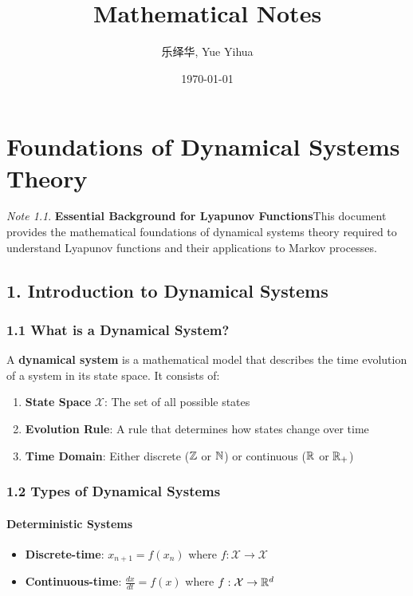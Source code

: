 \documentclass{amsart}
\author{乐绎华, Yue Yihua}
\date{\today}
\title{Mathematical Notes}
\let\originalmathbb\mathbb
\renewcommand{\mathbb}[1]{%
    \ifstrequal{#1}{1}{\mathbbm{#1}}{\originalmathbb{#1}}%
}
\theoremstyle{plain}
\theoremstyle{definition}
\theoremstyle{remark}
\newtheorem{note}[theorem]{Note}
\begin{document}
\maketitle
\tableofcontents

\chapter{Foundations of Dynamical Systems Theory}

\begin{note}
\textbf{Essential Background for Lyapunov Functions}This document provides the mathematical foundations of dynamical systems theory required to understand Lyapunov functions and their applications to Markov processes.
\end{note}
\section{1. Introduction to Dynamical Systems}

\subsection{1.1 What is a Dynamical System?}

A \textbf{dynamical system} is a mathematical model that describes the time evolution of a system in its state space. It consists of:

\begin{enumerate}
	\item \textbf{State Space} $\mathcal{X}$: The set of all possible states
	\item \textbf{Evolution Rule}: A rule that determines how states change over time
	\item \textbf{Time Domain}: Either discrete ($\mathbb{Z}$ or $\mathbb{N}$) or continuous ($\mathbb{R}$ or $\mathbb{R}_+$)
\end{enumerate}

\subsection{1.2 Types of Dynamical Systems}

\subsubsection{Deterministic Systems}

\begin{itemize}
	\item \textbf{Discrete-time}: $x_{n+1} = f(x_n)$ where $f: \mathcal{X} \to \mathcal{X}$
	\item \textbf{Continuous-time}: $\frac{dx}{dt} = f(x)$ where $f: \mathcal{X} \to \mathbb{R}^d$
\end{itemize}
\end{document}
